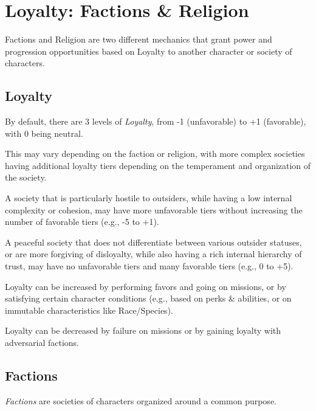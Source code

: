 
\chapter{Loyalty: Factions \& Religion}
Factions and Religion are two different mechanics that grant power and progression opportunities 
based on Loyalty to another character or society of characters.


\section{Loyalty}
By default, there are 3 levels of \textit{Loyalty}, 
from -1 (unfavorable) to +1 (favorable), with 0 being neutral.

\vspace{0.4em}

This may vary depending on the faction or religion, 
with more complex societies having additional loyalty tiers 
depending on the temperament and organization of the society.

\begin{Example}
  A society that is particularly hostile to outsiders, while having a low internal complexity or cohesion,
  may have more unfavorable tiers without increasing the number of favorable tiers (e.g., -5 to +1).

  \vspace{0.4em}

  A peaceful society that does not differentiate between various outsider statuses, 
  or are more forgiving of disloyalty, while also having a rich internal hierarchy of trust, 
  may have no unfavorable tiers and many favorable tiers (e.g., 0 to +5).
\end{Example}

Loyalty can be increased by performing favors and going on missions,
or by satisfying certain character conditions 
(e.g., based on perks \& abilities, or on immutable characteristics like Race/Species).

\vspace{0.4em}

Loyalty can be decreased by failure on missions or by gaining loyalty with adversarial factions.


\section{Factions}
\textit{Factions} are societies of characters organized around a common purpose.

\vspace{0.4em}

